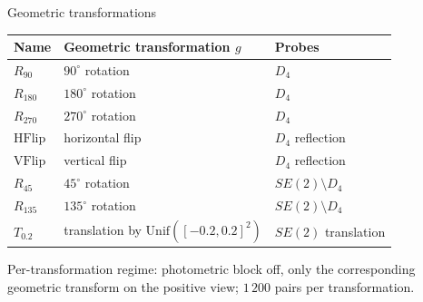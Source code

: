 \documentclass[aspectratio=169]{beamer}
\begin{document}
\begin{frame}{Geometric transformations}
    \begin{table}
    \centering
    \small
    \begin{tabular}{@{}lll@{}}
    \toprule
    Name & Geometric transformation $g$ & Probes \\
    \midrule
    $R_{90}$         & $90^\circ$ rotation                            & $D_4$ \\
    $R_{180}$        & $180^\circ$ rotation                           & $D_4$ \\
    $R_{270}$        & $270^\circ$ rotation                           & $D_4$ \\
    $\mathrm{HFlip}$ & horizontal flip                                & $D_4$ reflection \\
    $\mathrm{VFlip}$ & vertical flip                                  & $D_4$ reflection \\
    $R_{45}$         & $45^\circ$ rotation                            & $SE(2)\setminus D_4$ \\
    $R_{135}$        & $135^\circ$ rotation                           & $SE(2)\setminus D_4$ \\
    $T_{0.2}$        & translation by $\mathrm{Unif}([-0.2, 0.2]^2)$  & $SE(2)$ translation \\
    \bottomrule
    \end{tabular}
    \end{table}
    Per-transformation regime: photometric block off, only the corresponding geometric transform on the positive view; $1\,200$ pairs per transformation.
\end{frame}
\end{document}

